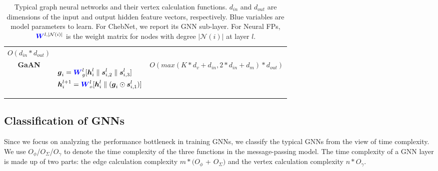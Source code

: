 \begin{table}
\begin{footnotesize}
\begin{tabular}{cp{20em}r}
			$O(d_{in} * d_{out})$                                                                                                                                                                                              \\
			\textbf{GaAN}                                                                                                                                                                                                    &
			\begin{scriptsize}
				$\begin{aligned}[t]
						 & \boldsymbol{g}_i = \textcolor{blue}{\boldsymbol{W}}^l_g  [\boldsymbol{h}_i^{l} \parallel \boldsymbol{s}_{i, 2}^l \parallel \boldsymbol{s}_{i, 3}^l] \\
						 & \boldsymbol{h}_i^{l+1} = \textcolor{blue}{\boldsymbol{W}}^l_o [\boldsymbol{h}_i^l \parallel (\boldsymbol{g}_{i} \odot \boldsymbol{s}_{i, 1}^l) ]
					\end{aligned}$
			\end{scriptsize}                                                                                                                                                                                   &
			$O(max(K * d_v + d_{in}, 2 * d_{in} + d_m) * d_{out})$                                                                                                                                                             \\ \bottomrule
		\end{tabular}
	\end{footnotesize}
	\caption{Typical graph neural networks and their vertex calculation functions.
        $d_{in}$ and $d_{out}$ are dimensions of the input and output hidden feature vectors, respectively.
        Blue variables are model parameters to learn. For ChebNet, we report its GNN sub-layer.
        For Neural FPs, $\textcolor{blue}{\boldsymbol{W}}^{l, |\mathcal{N}(i)|}$ is the weight matrix for nodes with degree $|\mathcal{N}(i)|$ at layer $l$.}
	\label{tab:gnn_overview_vertex}
\end{table}

\subsection{Classification of GNNs}

Since we focus on analyzing the performance bottleneck in training GNNs, we classify the typical GNNs from the view of time complexity.
We use $O_\phi$/$O_\Sigma$/$O_\gamma$ to denote the time complexity of the three functions in the message-passing model.
The time complexity of a GNN layer is made up of two parts: the edge calculation complexity $m * (O_\phi$ + $O_\Sigma)$ and the vertex calculation complexity $n * O_\gamma$.

